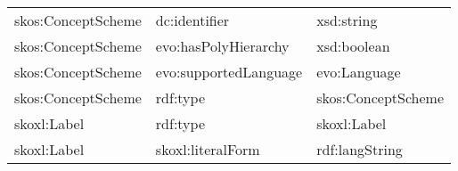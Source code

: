 \documentclass[10pt,a4paper,titlepage,final]{article}
\begin{document}
\begin{tabularx}{\textwidth}{llX}
         skos:ConceptScheme &           dc:identifier &                                         xsd:string \\
         skos:ConceptScheme &    evo:hasPolyHierarchy &                                        xsd:boolean \\
         skos:ConceptScheme &   evo:supportedLanguage &                                       evo:Language \\
         skos:ConceptScheme &                rdf:type &                                 skos:ConceptScheme \\
                skoxl:Label &                rdf:type &                                        skoxl:Label \\
                skoxl:Label &       skoxl:literalForm &                                     rdf:langString \\
\end{tabularx}
\end{document}
